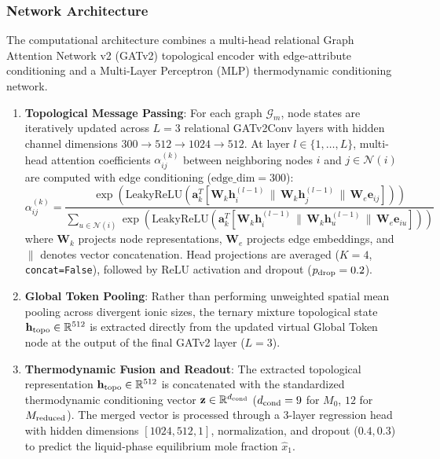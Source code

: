 \subsubsection{Network Architecture}
The computational architecture combines a multi-head relational Graph Attention Network v2 (GATv2) topological encoder with edge-attribute conditioning and a Multi-Layer Perceptron (MLP) thermodynamic conditioning network.

\begin{enumerate}
    \item \textbf{Topological Message Passing}: 
    For each graph $\mathcal{G}_m$, node states are iteratively updated across $L = 3$ relational GATv2Conv layers with hidden channel dimensions $300 \to 512 \to 1024 \to 512$. At layer $l \in \{1, \dots, L\}$, multi-head attention coefficients $\alpha_{ij}^{(k)}$ between neighboring nodes $i$ and $j \in \mathcal{N}(i)$ are computed with edge conditioning ($\text{edge\_dim} = 300$):
    \begin{equation}
        \alpha_{ij}^{(k)} = \frac{\exp\left(\text{LeakyReLU}\left(\mathbf{a}_k^T \left[\mathbf{W}_k \mathbf{h}_i^{(l-1)} \,\|\, \mathbf{W}_k \mathbf{h}_j^{(l-1)} \,\|\, \mathbf{W}_e \mathbf{e}_{ij}\right]\right)\right)}{\sum_{u \in \mathcal{N}(i)} \exp\left(\text{LeakyReLU}\left(\mathbf{a}_k^T \left[\mathbf{W}_k \mathbf{h}_i^{(l-1)} \,\|\, \mathbf{W}_k \mathbf{h}_u^{(l-1)} \,\|\, \mathbf{W}_e \mathbf{e}_{iu}\right]\right)\right)}
    \end{equation}
    where $\mathbf{W}_k$ projects node representations, $\mathbf{W}_e$ projects edge embeddings, and $\|$ denotes vector concatenation. Head projections are averaged ($K=4$, \texttt{concat=False}), followed by ReLU activation and dropout ($p_{\rm drop} = 0.2$).

    \item \textbf{Global Token Pooling}: 
    Rather than performing unweighted spatial mean pooling across divergent ionic sizes, the ternary mixture topological state $\mathbf{h}_{\rm topo} \in \mathbb{R}^{512}$ is extracted directly from the updated virtual Global Token node at the output of the final GATv2 layer ($L=3$).

    \item \textbf{Thermodynamic Fusion and Readout}: 
    The extracted topological representation $\mathbf{h}_{\rm topo} \in \mathbb{R}^{512}$ is concatenated with the standardized thermodynamic conditioning vector $\mathbf{z} \in \mathbb{R}^{d_{\rm cond}}$ ($d_{\rm cond} = 9$ for $M_0$, $12$ for $M_{\rm reduced}$). The merged vector is processed through a 3-layer regression head with hidden dimensions $[1024, 512, 1]$, normalization, and dropout ($0.4, 0.3$) to predict the liquid-phase equilibrium mole fraction $\hat{x}_1$.
\end{enumerate}

